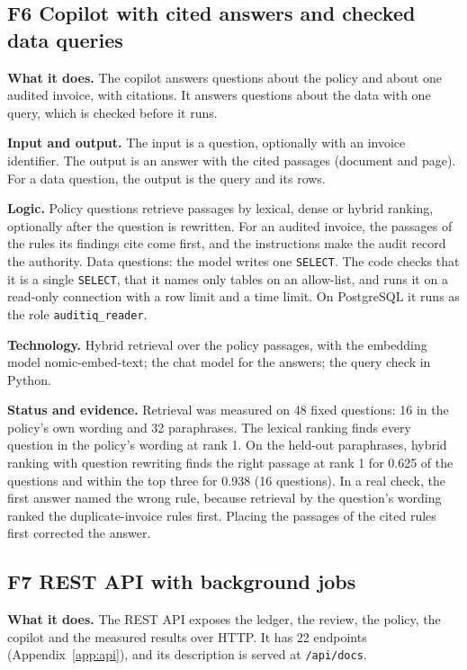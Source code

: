 \documentclass[11pt,a4paper]{article}
\begin{document}
\subsection{F6 Copilot with cited answers and checked data queries}
\textbf{What it does.} The copilot answers questions about the policy and about one audited invoice, with citations. It answers questions about the data with one query, which is checked before it runs.

\textbf{Input and output.} The input is a question, optionally with an invoice identifier. The output is an answer with the cited passages (document and page). For a data question, the output is the query and its rows.

\textbf{Logic.} Policy questions retrieve passages by lexical, dense or hybrid ranking, optionally after the question is rewritten. For an audited invoice, the passages of the rules its findings cite come first, and the instructions make the audit record the authority. Data questions: the model writes one \texttt{SELECT}. The code checks that it is a single \texttt{SELECT}, that it names only tables on an allow-list, and runs it on a read-only connection with a row limit and a time limit. On PostgreSQL it runs as the role \texttt{auditiq\_reader}.

\textbf{Technology.} Hybrid retrieval over the policy passages, with the embedding model nomic-embed-text; the chat model for the answers; the query check in Python.

\textbf{Status and evidence.} Retrieval was measured on 48 fixed questions: 16 in the policy's own wording and 32 paraphrases. The lexical ranking finds every question in the policy's wording at rank 1. On the held-out paraphrases, hybrid ranking with question rewriting finds the right passage at rank 1 for 0.625 of the questions and within the top three for 0.938 (16 questions). In a real check, the first answer named the wrong rule, because retrieval by the question's wording ranked the duplicate-invoice rules first. Placing the passages of the cited rules first corrected the answer.

\subsection{F7 REST API with background jobs}
\textbf{What it does.} The REST API exposes the ledger, the review, the policy, the copilot and the measured results over HTTP. It has 22 endpoints (Appendix~\ref{app:api}), and its description is served at \texttt{/api/docs}.
\end{document}
